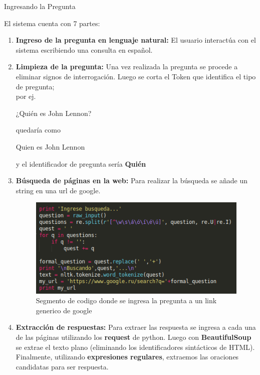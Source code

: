 \documentclass[final]{beamer}
\newlength{\onecolwid}
\newlength{\twocolwid}
\begin{document}
\begin{frame}[t]
\begin{columns}[t]
\begin{column}{\twocolwid}
\begin{columns}[t,totalwidth=\twocolwid]
\begin{column}{\onecolwid}\vspace{-.6in} %


\begin{block}{Ingresando la Pregunta}

El sistema cuenta con 7 partes: 
\begin{enumerate}
\item \textbf{Ingreso de la pregunta en lenguaje natural: }El usuario interactúa con el sistema escribiendo una consulta en español.
\item \textbf{Limpieza de la pregunta:} Una vez realizada la pregunta se procede a eliminar signos de interrogación. Luego se corta el Token que identifica el tipo de pregunta;\\por ej. 
\begin{center}
¿Quién es John Lennon? 
\end{center}
quedaría como 
\begin{center}
Quien es John Lennon 
\end{center}
y el identificador de pregunta sería \textbf{Quién}
\item \textbf{Búsqueda de páginas en la web:} Para realizar la búsqueda se añade un string en una url de google.
\begin{figure}
\centering
\includegraphics[scale=1.2]{img/google_link.png} 
\caption{Segmento de codigo donde se ingresa la pregunta a un link generico de google}
\end{figure}
\item \textbf{Extracción de respuestas:} Para extraer las respuesta se ingresa a cada una de las páginas utilizando los \textbf{request} de python. Luego con \textbf{BeautifulSoup} se extrae el texto plano (eliminando los identificadores sintácticos de HTML). Finalmente, utilizando \textbf{expresiones regulares}, extraemos las oraciones candidatas para ser respuesta.
\end{enumerate}


\end{block}
\end{column}
\end{columns}
\end{column}
\end{columns}
\end{frame}
\end{document}
